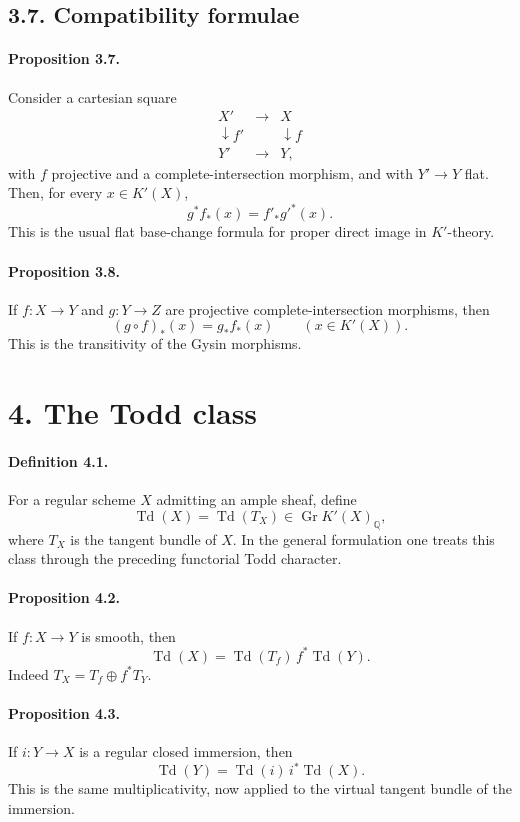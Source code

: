 \documentclass[12pt]{article}
\newcommand{\QQ}{\mathbb Q}
\newcommand{\Gr}{\operatorname{Gr}}
\newcommand{\Todd}{\operatorname{Td}}
\begin{document}
\subsection*{3.7. Compatibility formulae}

\paragraph{Proposition 3.7.}
Consider a cartesian square
\[
\begin{array}{ccc}
X'&\longrightarrow&X\\
\downarrow f'&&\downarrow f\\
Y'&\longrightarrow&Y,
\end{array}
\]
with $f$ projective and a complete-intersection morphism, and with $Y'\to Y$ flat. Then, for every $x\in K'(X)$,
\[
 g^*f_*(x)=f'_*g'^*(x).
\]
This is the usual flat base-change formula for proper direct image in $K'$-theory.

\paragraph{Proposition 3.8.}
If $f:X\to Y$ and $g:Y\to Z$ are projective complete-intersection morphisms, then
\[
 (g\circ f)_*(x)=g_*f_*(x)\qquad (x\in K'(X)).
\]
This is the transitivity of the Gysin morphisms.

\section*{4. The Todd class}

\paragraph{Definition 4.1.}
For a regular scheme $X$ admitting an ample sheaf, define
\[
\Todd(X)=\Todd(T_X)\in \Gr K'(X)_\QQ,
\]
where $T_X$ is the tangent bundle of $X$. In the general formulation one treats this class through the preceding functorial Todd character.

\paragraph{Proposition 4.2.}
If $f:X\to Y$ is smooth, then
\[
\Todd(X)=\Todd(T_f)\,f^*\Todd(Y).
\]
Indeed $T_X=T_f\oplus f^*T_Y$.

\paragraph{Proposition 4.3.}
If $i:Y\to X$ is a regular closed immersion, then
\[
\Todd(Y)=\Todd(i)\,i^*\Todd(X).
\]
This is the same multiplicativity, now applied to the virtual tangent bundle of the immersion.
\end{document}
